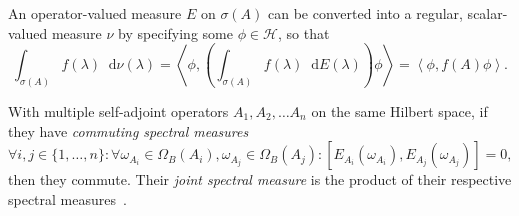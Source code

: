 \documentclass[10pt, a4paper]{article}
\numberwithin{equation}{section} %
\theoremstyle{definition}
\theoremstyle{plain}
\newcommand{\dif}{\mathop{}\!\mathrm{d}} %
\newcommand{\dintv}[2]{\mathopen\{#1,\ldots,#2\mathclose\}}
\newcommand{\?}{\mathrel{?}} %
\newcommand{\angleb}[1]{\left\langle #1 \right\rangle} %
\newcommand{\Hs}{\mathcal{H}} %
\begin{document}
\begin{appendices}
                    An operator-valued measure \(E\) on \(\sigma(A)\) can be converted into a regular, scalar-valued measure \(\nu\) by specifying some \(\phi \in \Hs\), so that
                    \[ \int_{\sigma(A)} f(\lambda) \dif{\nu(\lambda)} = \angleb{\phi, \left(\int_{\sigma(A)} f(\lambda) \dif{E(\lambda)}\right) \phi} = \angleb{\phi, f(A) \phi}. \]

                    With multiple self-adjoint operators \(A_1, A_2, \ldots A_n\) on the same Hilbert space, if they have \emph{commuting spectral measures}
                    \[ \forall i, j \in \dintv{1}{n} : \forall {\omega}_{A_i} \in \Omega_B({A_i}), {\omega}_{A_j} \in \Omega_B({A_j}) : [E_{A_i}({\omega}_{A_i}), E_{A_j}({\omega}_{A_j})] = 0, \]
                    then they commute. Their \emph{joint spectral measure} is the product of their respective spectral measures~\cite{SpectralTheoryQM}.


\end{appendices}
\end{document}
